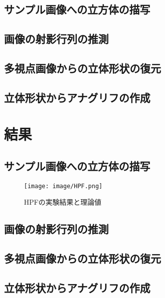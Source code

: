 \documentclass[11pt,a4j]{jsarticle}
\makeatletter
\newcommand{\figcaption}[1]{\def\@captype{figure}\caption{#1}}
\makeatother
\begin{document}
\subsection{サンプル画像への立方体の描写}
\label{sub:サンプル画像への立方体の描写}

\subsection{画像の射影行列の推測}
\label{sub:画像の射影行列の推測}

\subsection{多視点画像からの立体形状の復元}
\label{sub:多視点画像からの立体形状の復元}

\subsection{立体形状からアナグリフの作成}
\label{sub:立体形状からアナグリフの作成}

\section{結果}
\label{sec:結果}

\subsection{サンプル画像への立方体の描写}
\label{sub:result_box}

\begin{figure}[H]
  \centering
  \texttt{[image: image/HPF.png]}
  \figcaption{HPFの実験結果と理論値}
  \label{fig:hpf}
\end{figure}


\subsection{画像の射影行列の推測}
\label{sub:result_syaei}

\subsection{多視点画像からの立体形状の復元}
\label{sub:result_multimage}

\subsection{立体形状からアナグリフの作成}
\label{sub:result_anaglyph}
\end{document}
